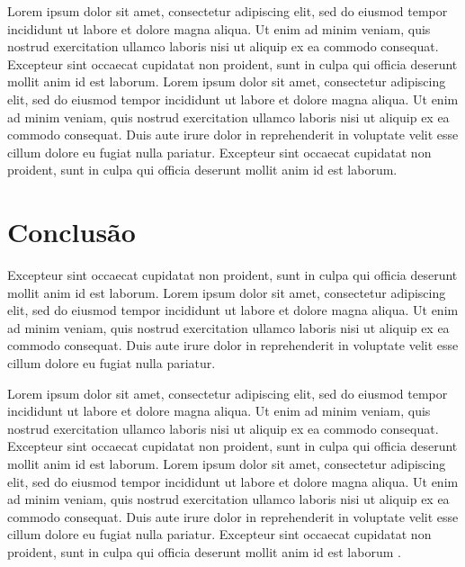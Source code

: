 \documentclass[portuguese]{sbc2025}%
\begin{document}
Lorem ipsum dolor sit amet, consectetur adipiscing elit, sed do eiusmod tempor incididunt ut labore et dolore magna aliqua. Ut enim ad minim veniam, quis nostrud exercitation ullamco laboris nisi ut aliquip ex ea commodo consequat. Excepteur sint occaecat cupidatat non proident, sunt in culpa qui officia deserunt mollit anim id est laborum. Lorem ipsum dolor sit amet, consectetur adipiscing elit, sed do eiusmod tempor incididunt ut labore et dolore magna aliqua. Ut enim ad minim veniam, quis nostrud exercitation ullamco laboris nisi ut aliquip ex ea commodo consequat. Duis aute irure dolor in reprehenderit in voluptate velit esse cillum dolore eu fugiat nulla pariatur. Excepteur sint occaecat cupidatat non proident, sunt in culpa qui officia deserunt mollit anim id est laborum.

\section{Conclusão}

Excepteur sint occaecat cupidatat non proident, sunt in culpa qui officia deserunt mollit anim id est laborum. Lorem ipsum dolor sit amet, consectetur adipiscing elit, sed do eiusmod tempor incididunt ut labore et dolore magna aliqua. Ut enim ad minim veniam, quis nostrud exercitation ullamco laboris nisi ut aliquip ex ea commodo consequat. Duis aute irure dolor in reprehenderit in voluptate velit esse cillum dolore eu fugiat nulla pariatur. 

Lorem ipsum dolor sit amet, consectetur adipiscing elit, sed do eiusmod tempor incididunt ut labore et dolore magna aliqua. Ut enim ad minim veniam, quis nostrud exercitation ullamco laboris nisi ut aliquip ex ea commodo consequat. Excepteur sint occaecat cupidatat non proident, sunt in culpa qui officia deserunt mollit anim id est laborum. Lorem ipsum dolor sit amet, consectetur adipiscing elit, sed do eiusmod tempor incididunt ut labore et dolore magna aliqua. Ut enim ad minim veniam, quis nostrud exercitation ullamco laboris nisi ut aliquip ex ea commodo consequat. Duis aute irure dolor in reprehenderit in voluptate velit esse cillum dolore eu fugiat nulla pariatur. Excepteur sint occaecat cupidatat non proident, sunt in culpa qui officia deserunt mollit anim id est laborum \citep{ref5}.
\end{document}
